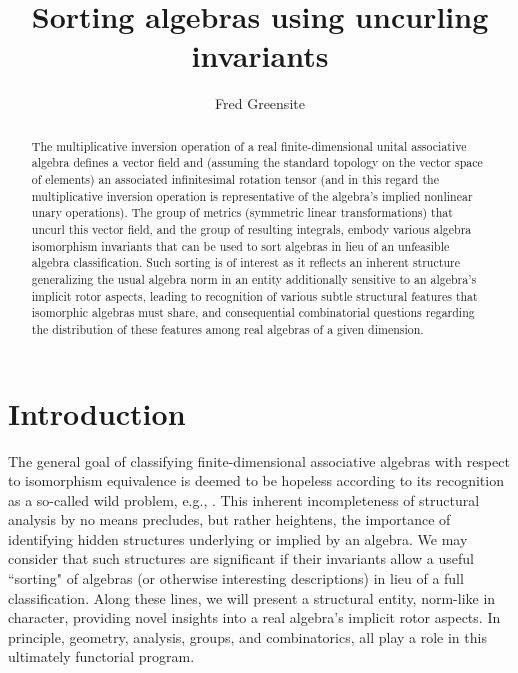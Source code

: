 \documentclass{amsart}
\numberwithin{equation}{section}
\theoremstyle{definition}
\numberwithin{theorem}{section}
\begin{document}
       
             \title{Sorting algebras using uncurling invariants}
    \author{Fred Greensite}
    
   \begin{abstract} The multiplicative inversion operation of a real finite-dimensional unital associative algebra defines a vector field and (assuming the standard topology on the vector space of elements) an associated infinitesimal rotation tensor (and in this regard the multiplicative inversion operation is representative of the algebra's implied nonlinear unary operations).  The group of metrics (symmetric linear transformations) that uncurl this vector field, and the group of resulting integrals, embody various algebra isomorphism invariants that can be used to sort algebras in lieu of an unfeasible algebra classification.  Such sorting is of interest as it reflects an inherent structure generalizing the usual algebra norm in an entity additionally sensitive to an algebra's implicit rotor aspects, leading to recognition of various subtle structural features that isomorphic algebras must share, and consequential combinatorial questions regarding the distribution of these features among real algebras of a given dimension.  \end{abstract}
        
  \maketitle
  
 \tableofcontents
 
 \section{Introduction} The general goal of classifying finite-dimensional associative algebras with respect to isomorphism equivalence is deemed to be hopeless according to its recognition as a so-called wild problem, e.g., \cite{eom:2024,drozd:1972,belitskii:2005}.   This inherent incompleteness of structural analysis by no means precludes, but rather heightens, the importance of identifying hidden structures underlying or implied by an algebra.  We may consider that such structures are significant if their invariants allow a useful ``sorting" of algebras (or otherwise interesting descriptions) in lieu of a full classification.   Along these lines, we will present a structural entity, norm-like in character, providing novel insights into a real algebra's implicit rotor aspects. \enlargethispage{.5cm} In principle, geometry, analysis, groups, and combinatorics, all play a role in this ultimately functorial program.
 
\end{document}
